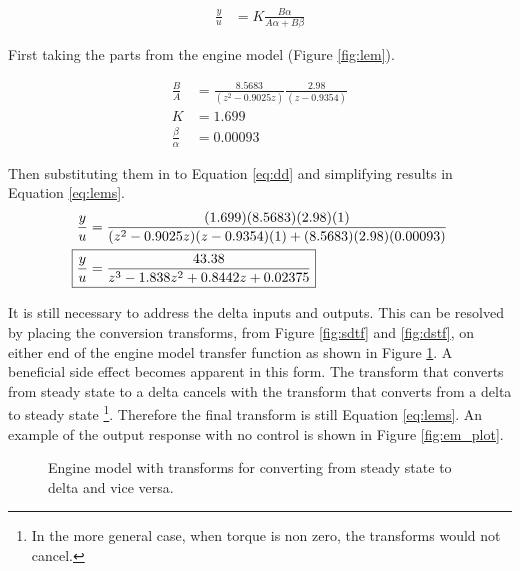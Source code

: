 \documentclass{article}
\begin{document}
\begin{align}
\frac{y}{u} &= K \frac{B \alpha}{A \alpha + B \beta} \label{eq:dd}
\end{align}

First taking the parts from the engine model (Figure \ref{fig:lem}).

\begin{align*}
	\frac{B}{A} &= \frac{8.5683}{(z^2 - 0.9025z)} \frac{2.98}{(z - 0.9354)} \\
	K &= 1.699 \\
	\frac{\beta}{\alpha} &= 0.00093 
\end{align*}

\begin{samepage}
Then substituting them in to Equation \ref{eq:dd} and simplifying
results in Equation \ref{eq:lems}.
\begin{align}
	\frac{y}{u} &= \frac{(1.699) (8.5683) (2.98) (1)}
		{(z^2 - 0.9025z)(z - 0.9354)(1) + (8.5683)(2.98)(0.00093)} \notag \\
	\Aboxed{ \frac{y}{u} &= \frac{43.38}{z^3 - 1.838 z^2 + 0.8442 z + 0.02375}}
		\label{eq:lems}
\end{align}
\end{samepage}

\begin{samepage}
It is still necessary to address the delta inputs and outputs.
This can be resolved by placing the conversion transforms,
from Figure \ref{fig:sdtf} and \ref{fig:dstf}, on either
end of the engine model transfer function as shown in Figure \ref{fig:nodelta}.
A beneficial side effect becomes apparent in this form.
The transform that converts from steady state to a delta cancels
with the transform that converts from a delta to steady state
\footnote{In the more general case, when torque is non zero,
the transforms would not cancel.}.
Therefore the final transform is still Equation \ref{eq:lems}.
An example of the output response with no control is shown in
Figure \ref{fig:em_plot}.
\end{samepage}

\begin{figure}[!htbp]

\begin{center}
\end{center}

\caption{Engine model with transforms for converting from steady state
to delta and vice versa.}
\label{fig:nodelta}

\end{figure}
\end{document}
